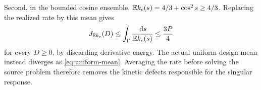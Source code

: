 Second, in the bounded cosine ensemble,
$\mathbb E k_c(s)=4/3+\cos^2s\ge4/3$. Replacing the realized rate by this
mean gives
\begin{equation}\label{eq:mean-rate-failure}
 J_{\mathbb E k_c}(D)\le\int_\Gamma\frac{\,\mathrm d s}{\mathbb E k_c(s)}\le\frac{3P}{4}
\end{equation}
for every $D\ge0$, by discarding derivative energy. The actual
uniform-design mean instead diverges as \eqref{eq:uniform-mean}.
Averaging the rate before solving the source problem therefore removes
the kinetic defects responsible for the singular response.
